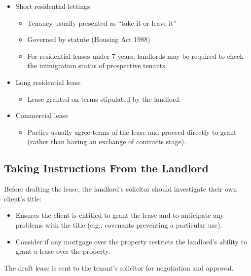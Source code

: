 \documentclass[
]{article}
\providecommand{\tightlist}{%
  \setlength{\itemsep}{0pt}\setlength{\parskip}{0pt}}
\begin{document}
\begin{itemize}
\tightlist
\item
  Short residential lettings

  \begin{itemize}
  \tightlist
  \item
    Tenancy usually presented as ``take it or leave it''
  \item
    Governed by statute (Housing Act 1988)
  \item
    For residential leases under 7 years, landlords may be required to
    check the immigration status of prospective tenants.
  \end{itemize}
\item
  Long residential lease

  \begin{itemize}
  \tightlist
  \item
    Lease granted on terms stipulated by the landlord.
  \end{itemize}
\item
  Commercial lease

  \begin{itemize}
  \tightlist
  \item
    Parties usually agree terms of the lease and proceed directly to
    grant (rather than having an exchange of contracts stage).
  \end{itemize}
\end{itemize}

\hypertarget{taking-instructions-from-the-landlord}{%
\subsection{Taking Instructions From the
Landlord}\label{taking-instructions-from-the-landlord}}

Before drafting the lease, the landlord's solicitor should investigate
their own client's title:

\begin{itemize}
\tightlist
\item
  Ensures the client is entitled to grant the lease and to anticipate
  any problems with the title (e.g., covenants preventing a particular
  use).
\item
  Consider if any mortgage over the property restricts the landlord's
  ability to grant a lease over the property.
\end{itemize}

The draft lease is sent to the tenant's solicitor for negotiation and
approval.
\end{document}

